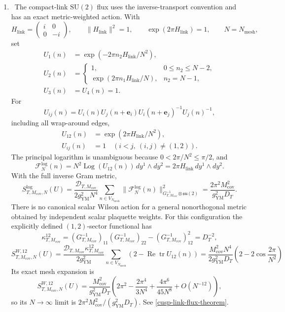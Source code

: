 \begin{enumerate}[leftmargin=1.8em]
\item \Verified\ The compact-link \(\mathrm{SU}(2)\) flux uses the
inverse-transport convention and has an exact metric-weighted action.  With
\[
 H_{\mathrm{link}}=\begin{pmatrix}i&0\\0&-i\end{pmatrix},\qquad
 \lVert H_{\mathrm{link}}\rVert^2=1,\qquad
 \exp(2\pi H_{\mathrm{link}})=1,\qquad
 N=N_{\mathrm{mesh}},
\]
set
\[
\begin{aligned}
 U_1(n)&=\exp(-2\pi n_2H_{\mathrm{link}}/N^2),\\
 U_2(n)&=
 \begin{cases}
  1,&0\le n_2\le N-2,\\
  \exp(2\pi n_1H_{\mathrm{link}}/N),&n_2=N-1,
 \end{cases}\\
 U_3(n)&=U_4(n)=1.
\end{aligned}
\]
For
\[
 U_{ij}(n)=U_i(n)U_j(n+\mathbf e_i)
 U_i(n+\mathbf e_j)^{-1}U_j(n)^{-1},
\]
including all wrap-around edges,
\begin{align*}
 U_{12}(n)&=\exp(2\pi H_{\mathrm{link}}/N^2),\\
 U_{ij}(n)&=1\quad(i<j,\ (i,j)\ne(1,2)).
\end{align*}
The principal logarithm is unambiguous because
\(0<2\pi/N^2\le\pi/2\), and
\[
 \mathcal F_N^{\log}(n)
 =N^2\operatorname{Log}(U_{12}(n))\,dy^1\wedge dy^2
 =2\pi H_{\mathrm{link}}\,dy^1\wedge dy^2.
\]
With the full inverse Gram metric,
\[
 S^{\log}_{T,M_{\mathrm{cov}},N}(U)
 =\frac{\mathcal D_{T,M_{\mathrm{cov}}}}{2g_{\mathrm{YM}}^2N^4}
 \sum_{n\in V_{N_{\mathrm{mesh}}}}
 \lVert\mathcal F_N^{\log}(n)\rVert^2_{
 G_{T,M_{\mathrm{cov}}}^{-1}\otimes\mathfrak{su}(2)}
 =\frac{2\pi^2M_{\mathrm{cov}}^2}{g_{\mathrm{YM}}^2D_T}.
\]
There is no canonical scalar Wilson action for a general nonorthogonal
metric obtained by independent scalar plaquette weights.  For this
configuration the explicitly defined \((1,2)\)-sector functional has
\[
 \kappa^{12}_{T,M_{\mathrm{cov}}}
 =(G_{T,M_{\mathrm{cov}}}^{-1})_{11}
  (G_{T,M_{\mathrm{cov}}}^{-1})_{22}
 -(G_{T,M_{\mathrm{cov}}}^{-1})_{12}^2
 =D_T^{-2},
\]
\[
 S^{W,12}_{T,M_{\mathrm{cov}},N}(U)
 =\frac{\mathcal D_{T,M_{\mathrm{cov}}}
        \kappa^{12}_{T,M_{\mathrm{cov}}}}{2g_{\mathrm{YM}}^2}
  \sum_{n\in V_{N_{\mathrm{mesh}}}}
  \left(2-\operatorname{Re}\operatorname{tr}U_{12}(n)\right)
 =\frac{M_{\mathrm{cov}}^2N^4}{2g_{\mathrm{YM}}^2D_T}
  \left(2-2\cos\frac{2\pi}{N^2}\right)
\]
Its exact mesh expansion is
\[
 S^{W,12}_{T,M_{\mathrm{cov}},N}(U)
 =\frac{M_{\mathrm{cov}}^2}{g_{\mathrm{YM}}^2D_T}
 \left(2\pi^2-\frac{2\pi^4}{3N^4}
       +\frac{4\pi^6}{45N^8}+O(N^{-12})\right),
\]
so its \(N\to\infty\) limit is
\(2\pi^2M_{\mathrm{cov}}^2/(g_{\mathrm{YM}}^2D_T)\).
See \cref{cusp-link-flux-theorem}.


\end{enumerate}
